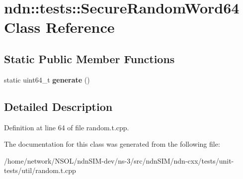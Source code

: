 \hypertarget{classndn_1_1tests_1_1SecureRandomWord64}{}\section{ndn\+:\+:tests\+:\+:Secure\+Random\+Word64 Class Reference}
\label{classndn_1_1tests_1_1SecureRandomWord64}
\subsection*{Static Public Member Functions}
\begin{DoxyCompactItemize}
\item 
static uint64\+\_\+t {\bfseries generate} ()\hypertarget{classndn_1_1tests_1_1SecureRandomWord64_a265a731e80db18e6c3323dd856adaf11}{}\label{classndn_1_1tests_1_1SecureRandomWord64_a265a731e80db18e6c3323dd856adaf11}

\end{DoxyCompactItemize}


\subsection{Detailed Description}


Definition at line 64 of file random.\+t.\+cpp.



The documentation for this class was generated from the following file\+:\begin{DoxyCompactItemize}
\item 
/home/network/\+N\+S\+O\+L/ndn\+S\+I\+M-\/dev/ns-\/3/src/ndn\+S\+I\+M/ndn-\/cxx/tests/unit-\/tests/util/random.\+t.\+cpp\end{DoxyCompactItemize}
